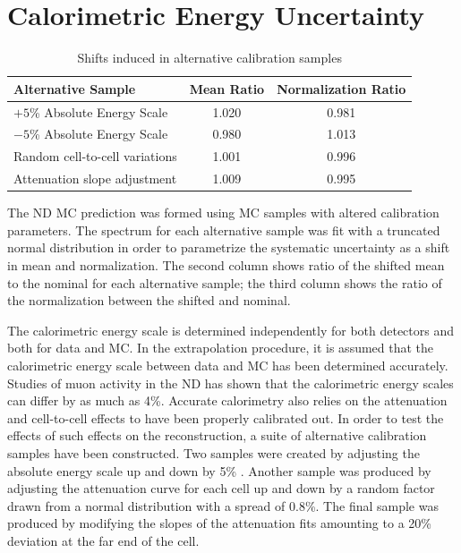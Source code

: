 {\begin{figure}
\end{figure}
\clearpage

\section{Calorimetric Energy Uncertainty}
\label{syst_cal_section}


\begin{table}
\begin{center}
\begin{tabular}{|l|c|c|}
\hline
\textbf{Alternative Sample} & \textbf{Mean Ratio} & \textbf{Normalization Ratio} \\ \hline
$+5$\% Absolute Energy Scale & 1.020 & 0.981 \\ \hline
$-5$\% Absolute Energy Scale& 0.980 & 1.013 \\ \hline
Random cell-to-cell variations & 1.001 & 0.996 \\ \hline
Attenuation slope adjustment & 1.009 & 0.995 \\ \hline
\end{tabular}
\end{center}
\caption{Shifts induced in alternative calibration samples}{
The ND MC prediction was formed using MC samples with altered calibration
parameters.
The spectrum for each alternative sample
was fit with a truncated normal distribution in order to
parametrize the systematic uncertainty as a shift in mean and normalization.
The second column shows ratio of the shifted mean to the nominal for each
alternative sample; the third column shows the ratio of the normalization
between the shifted and nominal.
}
\label{calib_shift_table}
\end{table}

The calorimetric energy scale is determined independently for both detectors
and both for data and MC.
In the extrapolation procedure, it is assumed that the calorimetric energy
scale between data and MC has been determined accurately.
Studies of muon activity in the ND has shown that the calorimetric
energy scales can differ by as much as 4\%.
Accurate calorimetry also relies on the attenuation and
cell-to-cell effects to have been properly calibrated out.
In order to test the effects of such effects on the reconstruction,
a suite of alternative calibration samples have been constructed.
Two samples were created by adjusting the absolute energy scale
up and down by 5\% \cite{lein2015thesis}.
Another sample was produced by adjusting the attenuation curve for
each cell up and down by a random factor drawn from a normal distribution
with a spread of 0.8\%.
The final sample was produced by modifying the slopes of the attenuation
fits amounting to a 20\% deviation at the far end of the cell.


}

